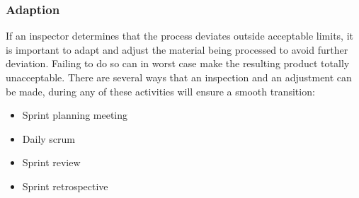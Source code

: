 \subsubsection{Adaption}


If an inspector determines that the process deviates outside acceptable limits, it is
important to adapt and adjust the material being processed to avoid further
deviation\cite{scrumguide11}. Failing to do so can in worst case make the resulting product
totally unacceptable\cite{scrumguide11}.
There are several ways that an inspection and an adjustment can be made, during any of these
activities will ensure a smooth transition:

\begin{itemize}
	\item Sprint planning meeting
	\item	Daily scrum
	\item	Sprint review
	\item	Sprint retrospective
\end{itemize}